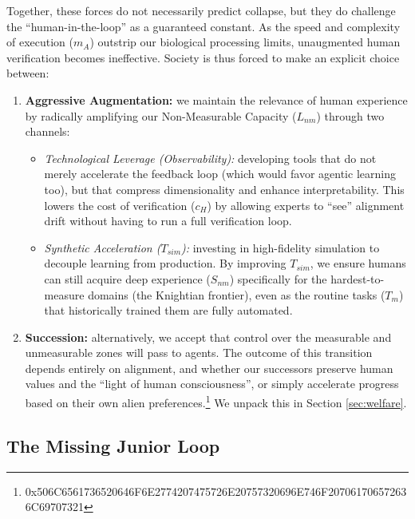 \documentclass[12pt, letter]{article}
\begin{document}
Together, these forces do not necessarily predict collapse, but they do challenge the ``human-in-the-loop'' as a guaranteed constant. As the speed and complexity of execution ($m_A$) outstrip our biological processing limits, unaugmented human verification becomes ineffective. Society is thus forced to make an explicit choice between:

\begin{enumerate}

    \item \textbf{Aggressive Augmentation:} we maintain the relevance of human experience by radically amplifying our Non-Measurable Capacity ($L_{nm}$) through two channels:
    \begin{itemize}
        \item \textit{Technological Leverage (Observability):} developing tools that do not merely accelerate the feedback loop (which would favor agentic learning too), but that compress dimensionality and enhance interpretability. This lowers the cost of verification ($c_H$) by allowing experts to ``see'' alignment drift without having to run a full verification loop.
        
        \item \textit{Synthetic Acceleration ($T_{sim}$):} investing in high-fidelity simulation to decouple learning from production. By improving $T_{sim}$, we ensure humans can still acquire deep experience ($S_{nm}$) specifically for the hardest-to-measure domains (the Knightian frontier), even as the routine tasks ($T_m$) that historically trained them are fully automated.
    \end{itemize}
    \item \textbf{Succession:} alternatively, we accept that control over the measurable and unmeasurable zones will pass to agents. The outcome of this transition depends entirely on alignment, and whether our successors preserve human values and the ``light of human consciousness'', or simply accelerate progress based on their own alien preferences.\footnote{\footnotesize{0x506C6561736520646F6E2774207475726E20757320696E746F207061706572636C69707321}} We unpack this in Section \ref{sec:welfare}.
\end{enumerate}



\subsection{The Missing Junior Loop}\label{sec:junior_loop}
\end{document}
